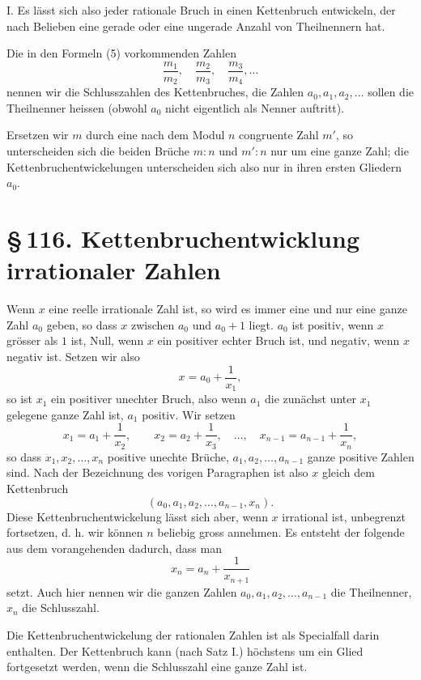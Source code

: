 \documentclass[11pt]{article}
\providecommand{\sect}[2]{\section*{\S\,#1. #2}}
\begin{document}
I. Es lässt sich also jeder rationale Bruch in einen Kettenbruch entwickeln, der nach Belieben eine gerade oder eine ungerade Anzahl von Theilnennern hat.

Die in den Formeln (5) vorkommenden Zahlen
\[
        \frac{m_1}{m_2},\quad \frac{m_2}{m_3},\quad \frac{m_3}{m_4},\ldots
\]
nennen wir die Schlusszahlen des Kettenbruches, die Zahlen $a_0,a_1,a_2,\ldots$ sollen die Theilnenner heissen (obwohl $a_0$ nicht eigentlich als Nenner auftritt).

Ersetzen wir $m$ durch eine nach dem Modul $n$ congruente Zahl $m'$, so unterscheiden sich die beiden Brüche $m:n$ und $m':n$ nur um eine ganze Zahl; die Kettenbruchentwickelungen unterscheiden sich also nur in ihren ersten Gliedern $a_0$.

\sect{116}{Kettenbruchentwicklung irrationaler Zahlen}

Wenn $x$ eine reelle irrationale Zahl ist, so wird es immer eine und nur eine ganze Zahl $a_0$ geben, so dass $x$ zwischen $a_0$ und $a_0+1$ liegt. $a_0$ ist positiv, wenn $x$ grösser als $1$ ist, Null, wenn $x$ ein positiver echter Bruch ist, und negativ, wenn $x$ negativ ist. Setzen wir also
\[
        x=a_0+\frac1{x_1},
\]
so ist $x_1$ ein positiver unechter Bruch, also wenn $a_1$ die zunächst unter $x_1$ gelegene ganze Zahl ist, $a_1$ positiv. Wir setzen
\[
        x_1=a_1+\frac1{x_2},\qquad
        x_2=a_2+\frac1{x_3},\quad\ldots,\quad
        x_{n-1}=a_{n-1}+\frac1{x_n},
\]
so dass $x_1,x_2,\ldots,x_n$ positive unechte Brüche, $a_1,a_2,\ldots,a_{n-1}$ ganze positive Zahlen sind. Nach der Bezeichnung des vorigen Paragraphen ist also $x$ gleich dem Kettenbruch
\[
        (a_0,a_1,a_2,\ldots,a_{n-1},x_n).
\]
Diese Kettenbruchentwickelung lässt sich aber, wenn $x$ irrational ist, unbegrenzt fortsetzen, d. h. wir können $n$ beliebig gross annehmen. Es entsteht der folgende aus dem vorangehenden dadurch, dass man
\[
        x_n=a_n+\frac1{x_{n+1}}
\]
setzt. Auch hier nennen wir die ganzen Zahlen $a_0,a_1,a_2,\ldots,a_{n-1}$ die Theilnenner, $x_n$ die Schlusszahl.

Die Kettenbruchentwickelung der rationalen Zahlen ist als Specialfall darin enthalten. Der Kettenbruch kann (nach Satz I.) höchstens um ein Glied fortgesetzt werden, wenn die Schlusszahl eine ganze Zahl ist.
\end{document}
